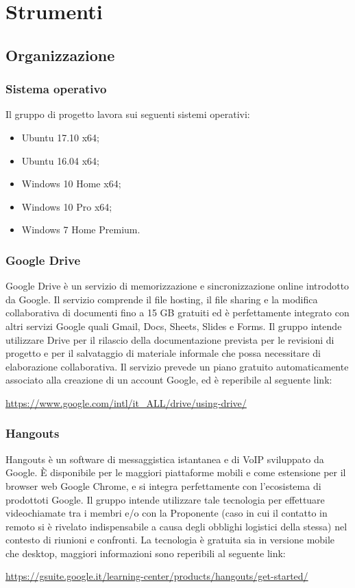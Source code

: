 \documentclass[../NormediProgetto.tex]{subfiles}
\begin{document}
	\section{Strumenti}
	
	\subsection{Organizzazione}
	
	\subsubsection{Sistema operativo}
	
	Il gruppo di progetto lavora sui seguenti sistemi operativi:
	\begin{itemize}
		\item Ubuntu 17.10 x64;
		\item Ubuntu 16.04  x64;
		\item Windows 10 Home x64;
		\item Windows 10 Pro x64;
		\item Windows 7 Home Premium.
	\end{itemize}

	\subsubsection{Google Drive}
	Google Drive è un servizio di memorizzazione e sincronizzazione online introdotto da Google. Il servizio comprende il file hosting, il file sharing e la modifica collaborativa di documenti fino a 15 GB gratuiti ed è perfettamente integrato con altri servizi Google quali Gmail, Docs, Sheets, Slides e Forms. Il gruppo intende utilizzare Drive per il rilascio della documentazione prevista per le revisioni di progetto e per il salvataggio di materiale informale che possa necessitare di elaborazione collaborativa. Il servizio prevede un piano gratuito automaticamente associato alla creazione di un account Google, ed è reperibile al seguente link:
	\begin{center}
		\url{https://www.google.com/intl/it_ALL/drive/using-drive/}
	\end{center}
	
	\subsubsection{Hangouts}
	Hangouts è un software di messaggistica istantanea e di VoIP sviluppato da Google. È disponibile per le maggiori piattaforme mobili e come estensione per il browser web Google Chrome, e si integra perfettamente con l'ecosistema di prodottoti Google. Il gruppo intende utilizzare tale tecnologia per effettuare videochiamate tra i membri e/o con la Proponente (caso in cui il contatto in remoto si è rivelato indispensabile a causa degli obblighi logistici della stessa) nel contesto di riunioni e confronti. La tecnologia è gratuita sia in versione mobile che desktop, maggiori informazioni sono reperibili al seguente link:
	\begin{center}
		\url{https://gsuite.google.it/learning-center/products/hangouts/get-started/}
	\end{center}
	
\end{document}

